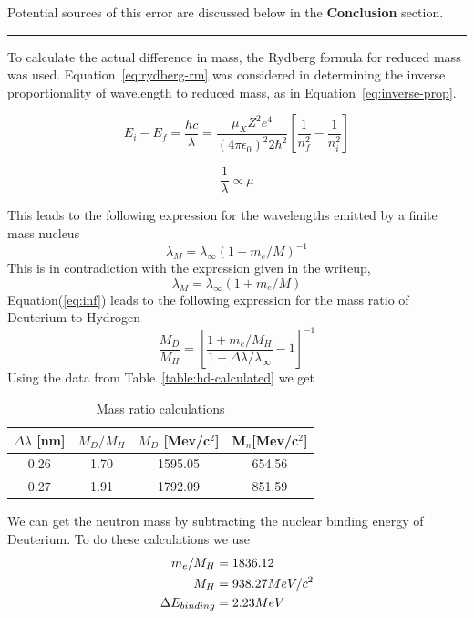 \documentclass[paper=a4, fontsize=11pt]{scrartcl} %
\numberwithin{equation}{section}
\numberwithin{figure}{section}
\numberwithin{table}{section}
\begin{document}
Potential sources of this error are discussed below in the \textbf{Conclusion} section.

\vspace{1.5em}
\hrule
\vspace{1.7em}

To calculate the actual difference in mass, the Rydberg formula for reduced mass was used. Equation~\ref{eq:rydberg-rm} was considered in determining the inverse proportionality of wavelength to reduced mass, as in Equation~\ref{eq:inverse-prop}.

\begin{equation}
\label{eq:rydberg-rm}
E_i - E_f = \dfrac{hc}{\lambda} = \dfrac{\mu_X Z^2 e^4}{\left( 4 \pi \epsilon_0 \right)^2 2 \hbar^2} \left[ \dfrac{1}{n^2_f} - \dfrac{1}{n_i^2} \right]
\end{equation}

\begin{equation}
\label{eq:inverse-prop}
\dfrac{1}{\lambda} \propto \mu
\end{equation}

This leads to the following expression for the wavelengths emitted by
a finite mass nucleus
\begin{equation}
  \label{eq:inf}
  \lambda_M = \lambda_{\infty}(1-m_e/M)^{-1}
\end{equation}
This is in contradiction with the expression given in the
writeup\cite{writeup},
\begin{equation}
  \label{eq:writeup}
  \lambda_M = \lambda_{\infty}(1+m_e/M)
\end{equation}
Equation(\ref{eq:inf}) leads to the following expression for the mass
ratio of Deuterium to Hydrogen
\begin{equation}
  \label{eq:ratio}
  \frac{M_D}{M_H} =
  \left[
    \frac{1+m_e/M_H}{1-\Delta\lambda/\lambda_{\infty}}-1
  \right]^{-1}
\end{equation}
Using the data from Table~\ref{table:hd-calculated} we get
\begin{table}[h]
  \centering
  \begin{tabular}{|| c | ccc ||} \hline
    $\Delta \lambda$ [nm] & $M_D/M_H$ & $M_D$ [Mev/c$^2$] & M$_n$[Mev/c$^2$]\\ \hline
    0.26 & 1.70 & 1595.05 & 654.56 \\
    0.27 & 1.91 & 1792.09 & 851.59 \\ \hline
  \end{tabular}
  \caption{Mass ratio calculations}
  \label{tab:ratio}
\end{table}
We can get the neutron mass by subtracting the nuclear binding energy
of Deuterium. To do these calculations we use 
\begin{align}
\begin{split}
  \label{eq:things}
  \centering
  m_e/M_H &= 1836.12\\
  M_H & = 938.27 MeV/c^2\\
  \Delta E_{binding} & = 2.23 MeV
\end{split}
\end{align}
\end{document}
